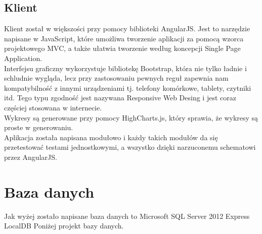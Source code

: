 \documentclass[10pt,titlepage]{article}
\begin{document}
\subsection{Klient}
Klient został w większości przy pomocy biblioteki AngularJS. Jest to narzędzie napisane w JavaScript, które umożliwa tworzenie aplikacji za pomocą wzorca projektowego MVC, a także ułatwia tworzenie według koncepcji Single Page Application.\\ Interfejsu graficzny wykorzystuje bibliotekę Bootstrap, która nie tylko ładnie i schludnie wygląda, lecz przy zastosowaniu pewnych reguł zapewnia nam kompatybilność z innymi urządzeniami tj. telefony komórkowe, tablety, czytniki itd. Tego typu zgodność jest nazywana Responsive Web Desing i jest coraz częściej stosowana w internecie.\\ Wykresy są generowane przy pomocy HighCharts.js, który sprawia, że wykresy są proste w generowaniu.\\ Aplikacja została napisana modułowo i każdy takich modułów da się przetestować testami jednostkowymi, a wszystko dzięki narzuconemu schematowi przez AngularJS.
\section{Baza danych}
Jak wyżej zostało napisane baza danych to Microsoft SQL Server 2012 Express LocalDB
Poniżej projekt bazy danych.
\end{document}
